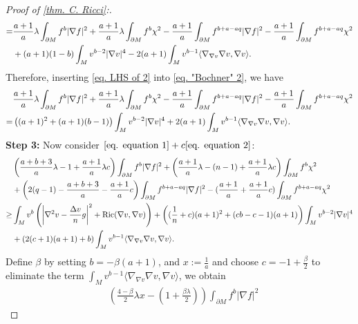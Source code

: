 \documentclass[12pt]{amsart}%
\numberwithin{equation}{section}
\numberwithin{lemma}{section}
\numberwithin{proposition}{section}
\numberwithin{corollary}{section}
\numberwithin{remark}{section}
\begin{document}
\begin{proof}[Proof of \cref{thm. C. Ricci}:]
\begin{align}
        =&\frac{a+1}{a}\lambda\int_{\partial M}f^b|\nabla f|^2
        +\frac{a+1}{a}\lambda\int_{\partial M}f^b\chi^2
        -\frac{a+1}{a}\int_{\partial M}f^{b+a-aq}|\nabla f|^2
        -\frac{a+1}{a}\int_{\partial M}f^{b+a-aq}\chi^2\notag\\
        &+(a+1)(1-b)\int_M v^{b-2}|\nabla v|^4
        -2(a+1)\int_M v^{b-1}\langle\nabla_{\nabla v}\nabla v,\nabla v\rangle.
    \end{align}
    Therefore, inserting \cref{eq. LHS of 2} into \cref{eq. "Bochner" 2},  we have
    \begin{align}\label{eq. equation 2}
        &\frac{a+1}{a}\lambda\int_{\partial M}f^b|\nabla f|^2
        +\frac{a+1}{a}\lambda\int_{\partial M}f^b\chi^2
        -\frac{a+1}{a}\int_{\partial M}f^{b+a-aq}|\nabla f|^2
        -\frac{a+1}{a}\int_{\partial M}f^{b+a-aq}\chi^2\notag\\
        =&\left(
        (a+1)^2+(a+1)(b-1)
        \right)\int_M v^{b-2}|\nabla v|^4
        +2(a+1)\int_M v^{b-1}\langle\nabla_{\nabla v}\nabla v,\nabla v\rangle.
    \end{align}
    \textbf{Step 3:} Now consider $\cref{eq. equation 1}+c\cref{eq. equation 2}$:
    \begin{align*}
        &\left(\frac{a+b+3}{a}\lambda-1+\frac{a+1}{a}\lambda c\right)
        \int_{\partial M}f^b|\nabla f|^2
        +\left(\frac{a+1}{a}\lambda-(n-1)+\frac{a+1}{a}\lambda c\right)
        \int_{\partial M}f^b\chi^2\notag\\
        &+\left(2(q-1)-\frac{a+b+3}{a}-\frac{a+1}{a}c\right)
        \int_{\partial M}f^{b+a-aq}|\nabla f|^2\notag
        -(\frac{a+1}{a}+\frac{a+1}{a}c)\int_{\partial M}f^{b+a-aq}\chi^2\\
        \geq & \int_M v^b\left(
        \left|\nabla^2 v-\frac{\Delta v}{n}g\right|^2
        +\mathrm{Ric}(\nabla v,\nabla v)
        \right)
        +\left((\frac{1}{n}+c)(a+1)^2
        +(cb-c-1)(a+1)\right)\int_M v^{b-2}|\nabla v|^4\notag\\
        &+\left(2(c+1)(a+1)+b\right)\int_M v^{b-1}\langle\nabla_{\nabla v}\nabla v,\nabla v\rangle.
    \end{align*}
   Define $\beta$ by setting $b=-\beta(a+1)$, and $x:=\frac{1}{a}$ and choose $c=-1+\frac{\beta}{2}$ to eliminate the  term $\int_M v^{b-1}\langle \nabla_{\nabla v}\nabla v,\nabla v\rangle$, we obtain
    \begin{align}\label{eq. Final ineq.}
        &\left(\frac{4-\beta}{2}\lambda x-(1+\frac{\beta\lambda}{2})\right)
        \int_{\partial M}f^b|\nabla f|^2

\end{align}
\end{proof}
\end{document}
